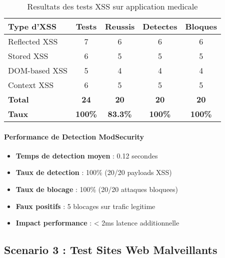 \begin{table}[H]
    \centering
    \caption{Resultats des tests XSS sur application medicale}
    \begin{tabular}{|l|c|c|c|c|}
        \hline
        \textbf{Type d'XSS} & \textbf{Tests} & \textbf{Reussis} & \textbf{Detectes} & \textbf{Bloques} \\
        \hline
        Reflected XSS       & 7              & 6                & 6                 & 6                \\
        \hline
        Stored XSS          & 6              & 5                & 5                 & 5                \\
        \hline
        DOM-based XSS       & 5              & 4                & 4                 & 4                \\
        \hline
        Context XSS         & 6              & 5                & 5                 & 5                \\
        \hline
        \textbf{Total}      & \textbf{24}    & \textbf{20}      & \textbf{20}       & \textbf{20}      \\
        \hline
        \textbf{Taux}       & \textbf{100\%} & \textbf{83.3\%}  & \textbf{100\%}    & \textbf{100\%}   \\
        \hline
    \end{tabular}
\end{table}

\paragraph{Performance de Detection ModSecurity}

\begin{itemize}
    \item \textbf{Temps de detection moyen} : 0.12 secondes
    \item \textbf{Taux de detection} : 100\% (20/20 payloads XSS)
    \item \textbf{Taux de blocage} : 100\% (20/20 attaques bloquees)
    \item \textbf{Faux positifs} : 5 blocages sur trafic legitime
    \item \textbf{Impact performance} : < 2ms latence additionnelle
\end{itemize}

\subsection{Scenario 3 : Test Sites Web Malveillants}

